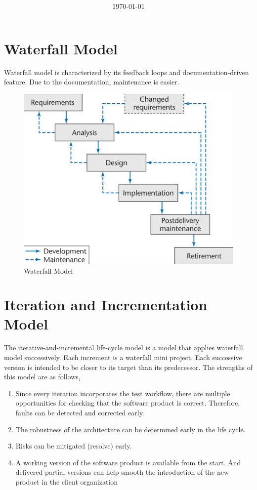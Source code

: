 \documentclass[11pt]{article}
\title{\textbf{\Topic}}
\author{\Name}
\date{\today}
\begin{document}
\maketitle
\noindent\makebox[\linewidth]{\rule[8pt]{5in}{0.5pt}}
 
\section*{Waterfall Model}

Waterfall model is characterized by its feedback loops and documentation-driven feature.
Due to the documentation, maintenance is easier.

\begin{figure}[h]
	\centering
	\includegraphics[width=0.6\linewidth]{images/Waterfall.png}
	\caption{Waterfall Model }
	\label{fig:Waterfall}
\end{figure}

\section*{Iteration and Incrementation Model}

The iterative-and-incremental life-cycle model is a model that applies waterfall model successively. Each increment is a waterfall mini project. Each successive version is intended to be closer to its target than its predecessor. The strengths of this model are as follows, 

\begin{enumerate}
	\item Since every iteration incorporates the test workflow, there are multiple opportunities for checking that the software product is correct. Therefore, faults can be detected and corrected early.
	
	\item The robustness of the architecture can be determined early in the life cycle.
	
	\item Risks can be mitigated (resolve) early.
	
	\item A working version of the software product is available from the start. And delivered partial versions can help smooth the introduction of the new product in the client organization
\end{enumerate}
\end{document}
